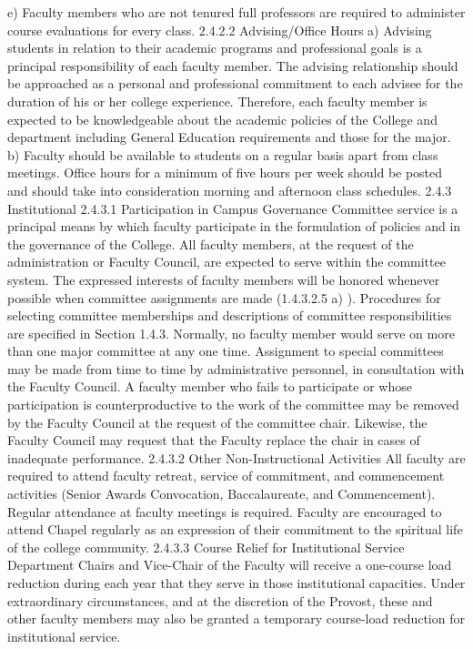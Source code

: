 \documentclass[letterpaper, 11pt]{article}
\begin{document}
e) Faculty members who are not tenured full professors are required to administer course evaluations for every class.
2.4.2.2 Advising/Office Hours
a) Advising students in relation to their academic programs and professional goals is a principal responsibility of each faculty member.  The advising relationship should be approached as a personal and professional commitment to each advisee for the duration of his or her college experience.  Therefore, each faculty member is expected to be knowledgeable about the academic policies of the College and department including General Education requirements and those for the major.
b) Faculty should be available to students on a regular basis apart from class meetings. Office hours for a minimum of five hours per week should be posted and should take into consideration morning and afternoon class schedules.
2.4.3 Institutional
2.4.3.1 Participation in Campus Governance
   Committee service is a principal means by which faculty participate in the formulation of policies and in the governance of the College.  All faculty members, at the request of the administration or Faculty Council, are expected to serve within the committee system.  The expressed interests of faculty members will be honored whenever possible when committee assignments are made (1.4.3.2.5 a) ).  Procedures for selecting committee memberships and descriptions of committee responsibilities are specified in Section 1.4.3.  Normally, no faculty member would serve on more than one major committee at any one time.  Assignment to special committees may be made from time to time by administrative personnel, in consultation with the Faculty Council.  A faculty member who fails to participate or whose participation is counterproductive to the work of the committee may be removed by the Faculty Council at the request of the committee chair.  Likewise, the Faculty Council may request that the Faculty replace the chair in cases of inadequate performance.
2.4.3.2 Other Non-Instructional Activities
   All faculty are required to attend faculty retreat, service of commitment, and commencement activities (Senior Awards Convocation, Baccalaureate, and Commencement).  Regular attendance at faculty meetings is required.  Faculty are encouraged to attend Chapel regularly as an expression of their commitment to the spiritual life of the college community.
2.4.3.3 Course Relief for Institutional Service
   Department Chairs and Vice-Chair of the Faculty will receive a one-course load reduction during each year that they serve in those institutional capacities.  Under extraordinary circumstances, and at the discretion of the Provost, these and other faculty members may also be granted a temporary course-load reduction for institutional service.
\end{document}
